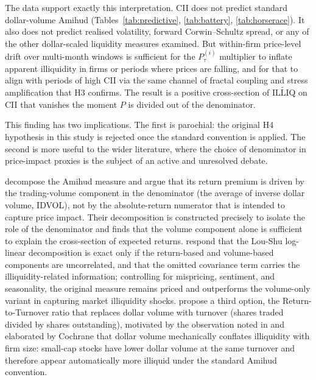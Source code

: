\documentclass[preprint,12pt,authoryear]{elsarticle}
\begin{document}
The data support exactly this interpretation. CII does not predict standard dollar-volume Amihud (Tables~\ref{tab:predictive}, \ref{tab:battery}, \ref{tab:horserace}). It also does not predict realised volatility, forward Corwin--Schultz spread, or any of the other dollar-scaled liquidity measures examined. But within-firm price-level drift over multi-month windows is sufficient for the $P^{(i)}_\tau$ multiplier to inflate apparent illiquidity in firms or periods where prices are falling, and for that to align with periods of high CII via the same channel of fractal coupling and stress amplification that H3 confirms. The result is a positive cross-section of $\widetilde{\mathrm{ILLIQ}}$ on CII that vanishes the moment $P$ is divided out of the denominator.

This finding has two implications. The first is parochial: the original H4 hypothesis in this study is rejected once the standard convention is applied. The second is more useful to the wider literature, where the choice of denominator in price-impact proxies is the subject of an active and unresolved debate.

\citet{lou2017price} decompose the Amihud measure and argue that its return premium is driven by the trading-volume component in the denominator (the average of inverse dollar volume, IDVOL), not by the absolute-return numerator that is intended to capture price impact. Their decomposition is constructed precisely to isolate the role of the denominator and finds that the volume component alone is sufficient to explain the cross-section of expected returns. \citet{amihud2021illiquidity} respond that the Lou-Shu log-linear decomposition is exact only if the return-based and volume-based components are uncorrelated, and that the omitted covariance term carries the illiquidity-related information; controlling for mispricing, sentiment, and seasonality, the original measure remains priced and outperforms the volume-only variant in capturing market illiquidity shocks. \citet{florackis2011trading} propose a third option, the Return-to-Turnover ratio that replaces dollar volume with turnover (shares traded divided by shares outstanding), motivated by the observation noted in \citet{lo1991long} and elaborated by Cochrane that dollar volume mechanically conflates illiquidity with firm size: small-cap stocks have lower dollar volume at the same turnover and therefore appear automatically more illiquid under the standard Amihud convention.
\end{document}
